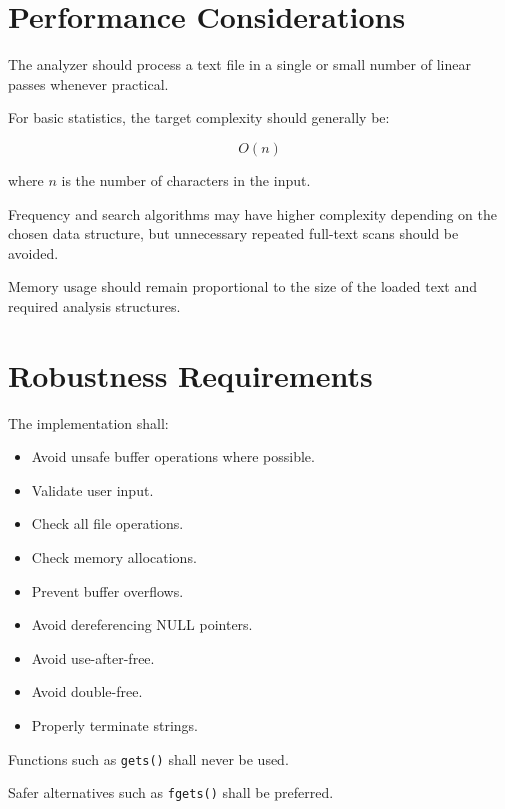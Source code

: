 \documentclass[12pt,a4paper]{article}
\begin{document}
\section{Performance Considerations}

The analyzer should process a text file in a single or small number of
linear passes whenever practical.

For basic statistics, the target complexity should generally be:

\[
O(n)
\]

where \(n\) is the number of characters in the input.

Frequency and search algorithms may have higher complexity depending on
the chosen data structure, but unnecessary repeated full-text scans
should be avoided.

Memory usage should remain proportional to the size of the loaded text
and required analysis structures.


\section{Robustness Requirements}

The implementation shall:

\begin{itemize}
    \item Avoid unsafe buffer operations where possible.
    \item Validate user input.
    \item Check all file operations.
    \item Check memory allocations.
    \item Prevent buffer overflows.
    \item Avoid dereferencing NULL pointers.
    \item Avoid use-after-free.
    \item Avoid double-free.
    \item Properly terminate strings.
\end{itemize}

Functions such as \texttt{gets()} shall never be used.

Safer alternatives such as \texttt{fgets()} shall be preferred.

\end{document}
